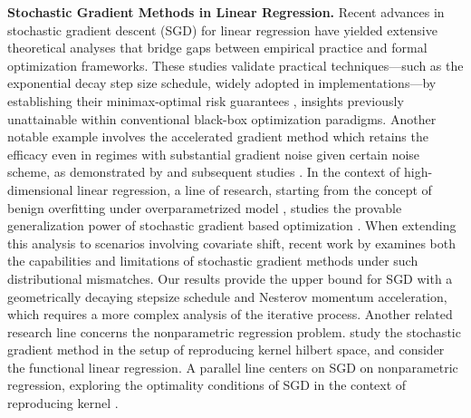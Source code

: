 \noindent\textbf{Stochastic Gradient Methods in Linear Regression.}
Recent advances in stochastic gradient descent (SGD) for linear regression have yielded extensive theoretical analyses that bridge gaps between empirical practice and formal optimization frameworks. These studies validate practical techniques—such as the exponential decay step size schedule, widely adopted in implementations—by establishing their minimax-optimal risk guarantees \citep{ge2019step, pan2021eigencurve}, insights previously unattainable within conventional black-box optimization paradigms. Another notable example involves the accelerated gradient method which retains the efficacy even in regimes with substantial gradient noise given certain noise scheme, as demonstrated by \citet{jain2018accelerating} and subsequent studies \citep{varre2022accelerated}.
In the context of high-dimensional linear regression, a line of research, starting from the concept of benign overfitting under overparametrized model \citet{bartlett2020benign}, studies the provable generalization power of stochastic gradient based optimization \citep{zou2021benign, wu2022last, lirisk,Zhang2024OptimalityAcceleratedSGD}. 
When extending this analysis to scenarios involving covariate shift, recent work by \citet{wu2022power} examines both the capabilities and limitations of stochastic gradient methods under such distributional mismatches.
Our results provide the upper bound for SGD with a geometrically decaying stepsize schedule and Nesterov momentum acceleration, which requires a more complex analysis of the iterative process. 
Another related research line concerns the nonparametric regression problem. \citet{Dieuleveut2016NonparametricStochasticApproximation} study the stochastic gradient method in the setup of reproducing kernel hilbert space, and \citet{cai2006prediction} consider the functional linear regression.
A parallel line centers on SGD on nonparametric regression, exploring the optimality conditions of SGD in the context of reproducing kernel \citep{Dieuleveut2016NonparametricStochasticApproximation}.